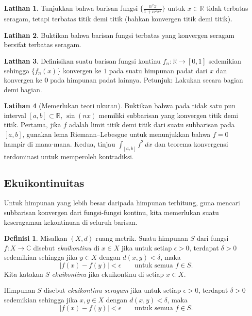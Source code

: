 \documentclass[12pt,openany]{book}
\newcommand{\sabs}[1]{\lvert {#1} \rvert}
\newcommand{\C}{{\mathbb{C}}}
\newcommand{\R}{{\mathbb{R}}}
\newcommand{\myindex}[1]{#1\index{#1}}
\theoremstyle{plain}
\theoremstyle{remark}
\theoremstyle{definition}
\newtheorem{defn}[thm]{Definisi}
\newenvironment{exbox}{%
    \def\FrameCommand{\vrule width 1pt \relax\hspace{10pt}}%
    \MakeFramed{\advance\hsize-\width\FrameRestore}%
}{%
    \endMakeFramed
}
\theoremstyle{exercise}
\newtheorem{exercise}{Latihan}[section]
\theoremstyle{example}
\begin{document}
\begin{exbox}
\begin{exercise}
Tunjukkan bahwa barisan fungsi $\bigl\{ \frac{n^2x}{1+n^2x^2} \bigr\}$
untuk $x \in \R$ tidak terbatas seragam, tetapi terbatas titik demi titik (bahkan
konvergen titik demi titik).
\end{exercise}

\begin{exercise}
Buktikan bahwa barisan fungsi terbatas yang konvergen seragam bersifat terbatas seragam.
\end{exercise}

\begin{exercise}
Definisikan suatu barisan fungsi kontinu $f_n \colon \R \to [0,1]$ sedemikian
sehingga $\{ f_n(x) \}$ konvergen ke $1$ pada suatu himpunan padat dari $x$ dan konvergen ke
$0$ pada himpunan padat lainnya.
Petunjuk: Lakukan secara bagian demi bagian.
\end{exercise}

\begin{exercise}[Memerlukan teori ukuran]
Buktikan bahwa pada tidak satu pun interval $[a,b] \subset \R$, $\sin(nx)$
memiliki subbarisan yang konvergen titik demi titik.
Pertama, jika $f$ adalah limit titik demi titik dari suatu subbarisan pada $[a,b]$,
gunakan lema Riemann--Lebesgue untuk menunjukkan bahwa $f=0$ hampir di mana-mana.
Kedua, tinjau $\int_{[a,b]} f^2\, dx$ dan teorema konvergensi terdominasi untuk memperoleh 
kontradiksi.
\end{exercise}
\end{exbox}

\subsection{Ekuikontinuitas}

Untuk himpunan yang lebih besar daripada himpunan terhitung,
guna mencari subbarisan konvergen dari fungsi-fungsi kontinu,
kita memerlukan suatu keseragaman kekontinuan di seluruh barisan.

\begin{defn}
Misalkan $(X,d)$ ruang metrik.
Suatu himpunan $S$ dari fungsi
$f \colon X \to \C$ disebut 
\emph{\myindex{ekuikontinu}} di $x \in X$
jika untuk setiap $\epsilon > 0$, terdapat $\delta > 0$
sedemikian sehingga jika $y \in X$ dengan $d(x,y) < \delta$, maka
\begin{equation*}
\sabs{f(x)-f(y)} < \epsilon \qquad \text{untuk semua } f \in S .
\end{equation*}
Kita katakan $S$ \emph{ekuikontinu} jika ekuikontinu di setiap $x \in X$.

Himpunan $S$ disebut 
\emph{\myindex{ekuikontinu seragam}}
jika untuk setiap $\epsilon > 0$, terdapat $\delta > 0$
sedemikian sehingga jika $x,y \in X$ dengan $d(x,y) < \delta$, maka
\begin{equation*}
\sabs{f(x)-f(y)} < \epsilon \qquad \text{untuk semua } f \in S .
\end{equation*}
\end{defn}
\end{document}
